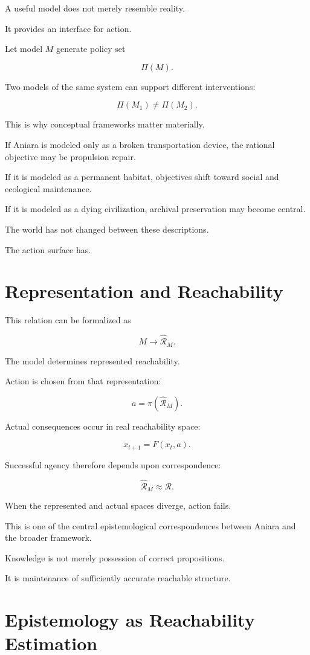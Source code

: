 \documentclass[11pt,oneside]{book}
\theoremstyle{definition}
\theoremstyle{remark}
\newcommand{\R}{\mathcal{R}}
\begin{document}
A useful model does not merely resemble reality.

It provides an interface for action.

Let model \(M\) generate policy set

\[
\Pi(M).
\]

Two models of the same system can support different interventions:

\[
\Pi(M_1)\neq\Pi(M_2).
\]

This is why conceptual frameworks matter materially.

If Aniara is modeled only as a broken transportation device, the rational objective may be propulsion repair.

If it is modeled as a permanent habitat, objectives shift toward social and ecological maintenance.

If it is modeled as a dying civilization, archival preservation may become central.

The world has not changed between these descriptions.

The action surface has.

\section{Representation and Reachability}

This relation can be formalized as

\[
M
\rightarrow
\widehat{\R}_M.
\]

The model determines represented reachability.

Action is chosen from that representation:

\[
a
=
\pi(\widehat{\R}_M).
\]

Actual consequences occur in real reachability space:

\[
x_{t+1}
=
F(x_t,a).
\]

Successful agency therefore depends upon correspondence:

\[
\widehat{\R}_M
\approx
\R.
\]

When the represented and actual spaces diverge, action fails.

This is one of the central epistemological correspondences between Aniara and the broader framework.

Knowledge is not merely possession of correct propositions.

It is maintenance of sufficiently accurate reachable structure.

\section{Epistemology as Reachability Estimation}
\end{document}
